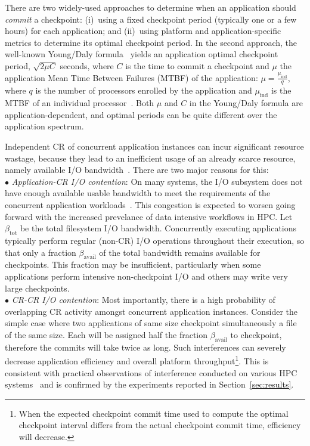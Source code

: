 \documentclass[conference,nofonttune]{IEEEtran}
\newcommand{\muind}{\mu_{\text{ind}}}
\newcommand{\bandtotal}{\beta_{\text{tot}}}
\newcommand{\bandavail}{\beta_{\text{avail}}}
\begin{document}
There are two widely-used approaches to determine when an application should
\emph{commit} a checkpoint: (i)~using a fixed checkpoint period (typically one
or a few hours) for each application; and (ii)~using platform and
application-specific metrics to determine its optimal checkpoint period. In the
second approach, the well-known Young/Daly formula~\cite{young74,daly04} yields
an application optimal checkpoint period, $\sqrt{2 \mu C}$ seconds, where $C$
is the time to commit a checkpoint and $\mu$ the application Mean Time Between
Failures (MTBF) of the application: $\mu = \frac{\muind}{q}$,
where $q$ is the number of processors enrolled by the application and $\muind$
is the MTBF of an individual processor~\cite{springer-monograph}. 
Both $\mu$ and $C$ in the Young/Daly formula are application-dependent, and
optimal periods can be quite different over the application spectrum.

Independent CR of concurrent application instances can incur significant
resource wastage, because they lead to an inefficient usage of an already
scarce resource, namely available I/O bandwidth~\cite{Luu:2015:Multiplatform}.
There are two major reasons for this:\\
$\bullet$ \emph{Application-CR I/O contention}: On many systems, the I/O subsystem
does not have enough available usable bandwidth to meet the requirements of the
concurrent application workloads~\cite{Luu:2015:Multiplatform}. This congestion
is expected to worsen going forward with the increased prevelance of data
intensive workflows in HPC.  Let $\bandtotal$ be the total filesystem I/O
bandwidth.  Concurrently executing applications typically perform regular
(non-CR) I/O operations throughout their execution, so that only a fraction
$\bandavail$ of the total bandwidth remains available for checkpoints.  This
fraction may be insufficient, particularly when some applications perform
intensive non-checkpoint I/O and others may write very large checkpoints.\\
$\bullet$ \emph{CR-CR I/O contention}: Most importantly, there is a
high probability of overlapping CR activity amongst concurrent
application instances.  Consider the simple case where two
applications of same size checkpoint simultaneously a file of the same
size. Each will be assigned half the fraction $\bandavail$ to
checkpoint, therefore the commits will take twice as long. Such
interferences can severely decrease application efficiency and overall
platform throughput\footnote{When the expected checkpoint commit time
  used to compute the optimal checkpoint interval differs from the
  actual checkpoint commit time, efficiency will decrease.}. This is
consistent with practical observations of interference conducted on
various HPC systems~\cite{Yildiz2016,MubarakCJLJSRCB17}
and is confirmed by the experiments reported in Section~\ref{sec:results}.
\end{document}
